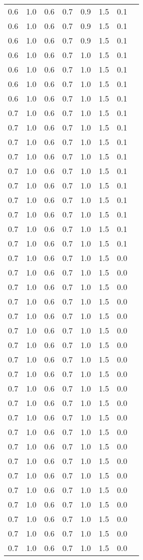 \begin{tabular}{L{1in}|L{1in}|L{1in}|L{1in}|L{1in}|L{1in}|L{1in}|L{1in}}
0.6&1.0&0.6&0.7&0.9&1.5&0.1\\
0.6&1.0&0.6&0.7&0.9&1.5&0.1\\
0.6&1.0&0.6&0.7&0.9&1.5&0.1\\
0.6&1.0&0.6&0.7&1.0&1.5&0.1\\
0.6&1.0&0.6&0.7&1.0&1.5&0.1\\
0.6&1.0&0.6&0.7&1.0&1.5&0.1\\
0.6&1.0&0.6&0.7&1.0&1.5&0.1\\
0.7&1.0&0.6&0.7&1.0&1.5&0.1\\
0.7&1.0&0.6&0.7&1.0&1.5&0.1\\
0.7&1.0&0.6&0.7&1.0&1.5&0.1\\
0.7&1.0&0.6&0.7&1.0&1.5&0.1\\
0.7&1.0&0.6&0.7&1.0&1.5&0.1\\
0.7&1.0&0.6&0.7&1.0&1.5&0.1\\
0.7&1.0&0.6&0.7&1.0&1.5&0.1\\
0.7&1.0&0.6&0.7&1.0&1.5&0.1\\
0.7&1.0&0.6&0.7&1.0&1.5&0.1\\
0.7&1.0&0.6&0.7&1.0&1.5&0.1\\
0.7&1.0&0.6&0.7&1.0&1.5&0.0\\
0.7&1.0&0.6&0.7&1.0&1.5&0.0\\
0.7&1.0&0.6&0.7&1.0&1.5&0.0\\
0.7&1.0&0.6&0.7&1.0&1.5&0.0\\
0.7&1.0&0.6&0.7&1.0&1.5&0.0\\
0.7&1.0&0.6&0.7&1.0&1.5&0.0\\
0.7&1.0&0.6&0.7&1.0&1.5&0.0\\
0.7&1.0&0.6&0.7&1.0&1.5&0.0\\
0.7&1.0&0.6&0.7&1.0&1.5&0.0\\
0.7&1.0&0.6&0.7&1.0&1.5&0.0\\
0.7&1.0&0.6&0.7&1.0&1.5&0.0\\
0.7&1.0&0.6&0.7&1.0&1.5&0.0\\
0.7&1.0&0.6&0.7&1.0&1.5&0.0\\
0.7&1.0&0.6&0.7&1.0&1.5&0.0\\
0.7&1.0&0.6&0.7&1.0&1.5&0.0\\
0.7&1.0&0.6&0.7&1.0&1.5&0.0\\
0.7&1.0&0.6&0.7&1.0&1.5&0.0\\
0.7&1.0&0.6&0.7&1.0&1.5&0.0\\
0.7&1.0&0.6&0.7&1.0&1.5&0.0\\
0.7&1.0&0.6&0.7&1.0&1.5&0.0\\
0.7&1.0&0.6&0.7&1.0&1.5&0.0\\

\end{tabular}
